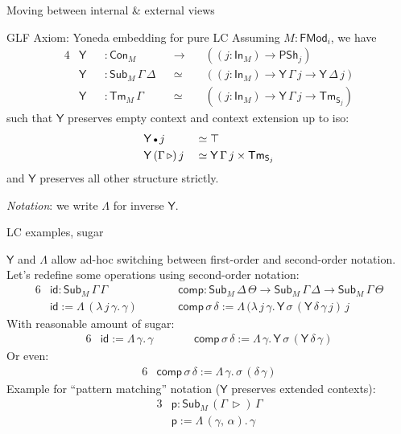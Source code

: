 \documentclass[dvipsnames,aspectratio=169]{beamer}
\newcommand{\ms}[1]{\mathsf{#1}}
\newcommand{\Con}{\mathsf{Con}}
\newcommand{\Sub}{\mathsf{Sub}}
\newcommand{\Tm}{\mathsf{Tm}}
\newcommand{\Y}{\mathsf{Y}}
\newcommand{\In}{\mathsf{In}}
\newcommand{\PSh}{\mathsf{PSh}}
\newcommand{\FMod}{\mathsf{FMod}}
\newcommand{\ext}{\triangleright}
\newcommand{\emptycon}{\scaleobj{.75}\bullet}
\renewcommand{\S}{\mathsf{S}}
\begin{document}
\begin{frame}{Moving between internal \& external views}

\begin{block}{GLF Axiom: Yoneda embedding for pure LC}
Assuming $M : \FMod_i$, we have
\begin{alignat*}{4}
  & \Y && : \Con_M                 &&\to\,  &&((j : \In_M) \to \PSh_j) \\
  & \Y && : \Sub_M\,\Gamma\,\Delta &&\simeq &&((j : \In_M) \to \Y\,\Gamma\,j \to \Y\,\Delta\,j)\\
  & \Y && : \Tm_M\,\Gamma          &&\simeq &&((j : \In_M) \to \Y\,\Gamma\,j \to \Tm_{\S_j})
\end{alignat*}
such that $\Y$ preserves empty context and context extension up to iso:
\begin{alignat*}{4}
  & \Y\,\emptycon\,j &&\simeq \top \\
  & \Y\,(\Gamma\,\ext)\,j &&\simeq \Y\,\Gamma\,j \times \Tm_{\S_j}
\end{alignat*}
and $\Y$ preserves all other structure strictly.
\end{block}
\emph{Notation}: we write $\Lambda$ for inverse $\Y$.
\end{frame}

\begin{frame}{LC examples, sugar}

$\Y$ and $\Lambda$ allow ad-hoc switching between first-order and second-order notation.
Let's redefine some operations using second-order notation:
\begin{alignat*}{6}
  & \ms{id} : \Sub_M\,\Gamma\,\Gamma && \ms{comp} : \Sub_M\,\Delta\,\Theta \to \Sub_M\,\Gamma\,\Delta \to \Sub_M\,\Gamma\,\Theta\\
  & \ms{id} := \Lambda\,(\lambda\,j\,\gamma.\,\gamma)\quad\quad && \ms{comp}\,\sigma\,\delta := \Lambda\,(\lambda\,j\,\gamma.\,\Y\,\sigma\,(\Y\,\delta\,\gamma\,j)\,j
\end{alignat*}
\pause
With reasonable amount of sugar:
\begin{alignat*}{6}
  & \ms{id} := \Lambda\,\gamma.\,\gamma\quad\quad && \ms{comp}\,\sigma\,\delta := \Lambda\,\gamma.\,\Y\,\sigma\,(\Y\,\delta\,\gamma)
\end{alignat*}
\pause
Or even:
\begin{alignat*}{6}
  &\ms{comp}\,\sigma\,\delta := \Lambda\,\gamma.\,\sigma\,(\delta\,\gamma)
\end{alignat*}
\pause
Example for ``pattern matching'' notation ($\Y$ preserves extended contexts):
\begin{alignat*}{3}
  & \ms{p} : \Sub_M\,(\Gamma\,\ext)\,\Gamma \\
  & \ms{p} := \Lambda\,(\gamma,\,\alpha).\,\gamma
\end{alignat*}

\end{frame}
\end{document}
